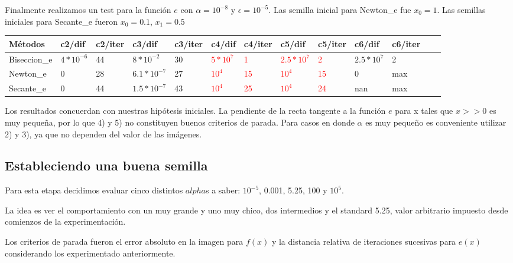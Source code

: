 Finalmente realizamos un test para la función $e$ con $\alpha = 10^{-8}$ y $\epsilon = 10^{-5}$. Las semilla inicial para Newton\_e fue $x_{0}=1$. Las semillas iniciales para Secante\_e fueron $x_{0} = 0.1$, 
$x_{1} = 0.5$

\begin{center}
    \small{
    \begin{tabular}{| l | l | l | l | l | l | l | l | l | l | l | l | l |}
    \hline
    Métodos & c2/dif & c2/iter & c3/dif & c3/iter & c4/dif & c4/iter & c5/dif & c5/iter & c6/dif & c6/iter \\ \hline
    Biseccion\_e & $4*10^{-6}$ & 44 & $8*10^{-2}$ & 30 & \textcolor{red}{$5*10^{7}$} & \textcolor{red}{1} & \textcolor{red}{$2.5*10^{7}$} & \textcolor{red}{2} & {$2.5*10^{7}$} & 2  \\ \hline
    Newton\_e & 0 & 28 & $6.1*10^{-7}$ & 27 & \textcolor{red}{$10^{4}$} & \textcolor{red}{15} & \textcolor{red}{$10^{4}$} & \textcolor{red}{15} & 0 & max \\ \hline
    Secante\_e & 0 & 44 & $1.5*10^{-7}$ & 43 & \textcolor{red}{$10^{4}$} & \textcolor{red}{25} & \textcolor{red}{$10^{4}$} & \textcolor{red}{24} & nan & max   \\ \hline
    \end{tabular}
    }
\end{center}

Los resultados concuerdan con nuestras hipótesis iniciales. La pendiente de la recta tangente a la función $e$ para x tales que $x >> 0$ es muy peque\~na, por lo que 4) y 5) no constituyen buenos
criterios de parada. Para casos en donde $\alpha$ es muy peque\~no es conveniente utilizar 2) y 3), ya que no dependen del valor de las imágenes.

\subsection{Estableciendo una buena semilla}

Para esta etapa decidimos evaluar cinco distintos $alpha$s a saber: $10^{-5}$, 0.001, 5.25, 100 y $10^5$.

La idea es ver el comportamiento con un \alpha muy grande y uno muy chico, dos intermedios y el standard 5.25, valor arbitrario impuesto desde comienzos de la experimentación.

Los criterios de parada fueron el error absoluto en la imagen para $f(x)$ y la distancia relativa de iteraciones sucesivas para $e(x)$ considerando los experimentado anteriormente.

